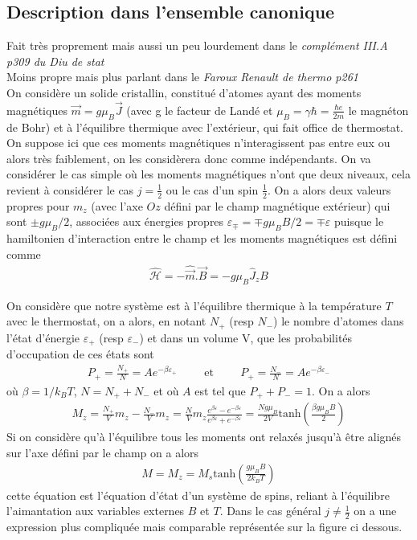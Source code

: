 \documentclass[12pt,prb,aps,epsf]{article}
\begin{document}
\subsection{Description dans l'ensemble canonique}
Fait très proprement mais aussi un peu lourdement dans le \textit{complément III.A p309 du Diu de stat}\\
Moins propre mais plus parlant dans le \textit{Faroux Renault de thermo p261}\\


On considère un solide cristallin, constitué d'atomes ayant des moments magnétiques $\vec{m} = g\mu_B\vec{J}$ (avec g le facteur de Landé et $\mu_B=\gamma\hbar = \frac{\hbar e}{2m}$ le magnéton de Bohr) et à l'équilibre thermique avec l'extérieur, qui fait office de thermostat. On suppose ici que ces moments magnétiques n'interagissent pas entre eux ou alors très faiblement, on les considèrera donc comme indépendants. On va considérer le cas simple où les moments magnétiques n'ont que deux niveaux, cela revient à considérer le cas $j=\frac{1}{2}$ ou le cas d'un spin $\frac{1}{2}$. On a alors deux valeurs propres pour $m_z$ (avec l'axe $Oz$ défini par le champ magnétique extérieur) qui sont $\pm g\mu_B/2$, associées aux énergies propres $\varepsilon_{\mp}=\mp g\mu_B B/2 = \mp \varepsilon$ puisque le hamiltonien d'interaction entre le champ et les moments magnétiques est défini comme
\begin{eqnarray}
\hat{\mathcal{H}} = -\hat{\vec{m}}.\vec{B} = -g\mu_B\hat{J}_zB
\end{eqnarray}

On considère que notre système est à l'équilibre thermique à la température $T$ avec le thermostat, on a alors, en notant $N_+$ (resp $N_-$) le nombre d'atomes dans l'état d'énergie $\varepsilon_+$ (resp $\varepsilon_-$) et dans un volume V, que les probabilités d'occupation de ces états sont 
\begin{eqnarray}
P_+ = \frac{N_+}{N} = Ae^{-\beta\varepsilon_+}\hspace{1cm}\mathrm{et}\hspace{1cm}P_+ = \frac{N_-}{N} = Ae^{-\beta\varepsilon_-}
\end{eqnarray} 
où $\beta = 1/k_BT$, $N=N_++N_-$ et où $A$ est tel que $P_++P_- = 1$. On a alors 
\begin{eqnarray}
M_z = \frac{N_+}{V}m_z - \frac{N_-}{V}m_z = \frac{N}{V}m_z \frac{e^{\beta\varepsilon} - e^{-\beta\varepsilon}}{e^{\beta\varepsilon}+e^{-\beta\varepsilon}} = \frac{Ng\mu_B}{2V}\mathrm{tanh}\left(\frac{\beta g\mu_B B}{2}\right)
\end{eqnarray}
Si on considère qu'à l'équilibre tous les moments ont relaxés jusqu'à être alignés sur l'axe défini par le champ on a alors 
\begin{eqnarray}
M = M_z  = M_s \mathrm{tanh}\left(\frac{g\mu_B B}{2k_BT}\right)
\end{eqnarray}
cette équation est l'équation d'état d'un système de spins, reliant à l'équilibre l'aimantation aux variables externes $B$ et $T$. Dans le cas général $j\neq\frac{1}{2}$ on a une expression plus compliquée mais comparable représentée sur la figure ci dessous.
\end{document}
